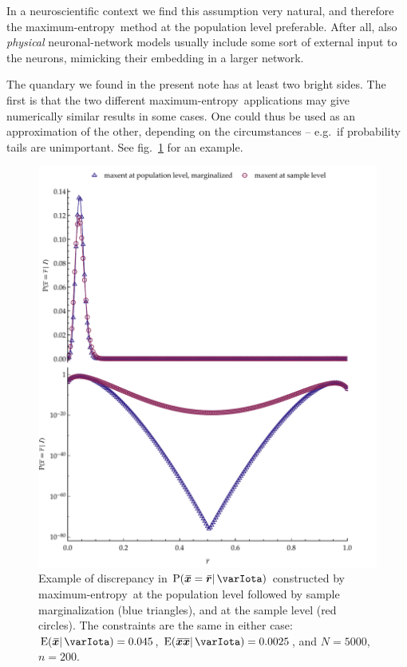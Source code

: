 \documentclass{article}
\theoremstyle{remark}
\theoremstyle{innote}
\renewcommand*{\|}{\mathpunct{|}}%
\newcommand*{\p}{\mathrm{P}}%
\newcommand*{\fig}{fig.}%
\newcommand*{\eg}{{e.g.}}
\newcommand*{\E}{\mathrm{E}}
\DeclarePairedDelimiter\expp{(}{)}
\newcommand*{\expe}{\E\expp}%
\theoremstyle{simple}
\newcommand*{\widebar}[1]{{\mkern1.5mu\skew{2}\overline{\mkern-1.5mu#1\mkern-1.5mu}\mkern 1.5mu}}
\newcommand*{\sav}{\widebar} %
\newcommand*{\yxx}{x}%
\newcommand*{\yx}{\bm{\yxx}}%
\newcommand*{\yxs}{\sav{\yx}}%
\newcommand*{\yxxs}{\sav{\yx\yx}}%
\newcommand*{\yr}{\bm{r}}%
\newcommand*{\yrs}{\sav{\yr}}%
\newcommand*{\yH}{\varIota}
\newcommand*{\me}{maximum-entropy}
\begin{document}
In a neuroscientific context we find this assumption very natural, and
therefore the \me\ method at the population level preferable. After all,
also \emph{physical} neuronal-network models usually include some sort of
external input to the neurons, mimicking their embedding in a larger
network.

\iffalse
The quandary we found in the present note has at least two bright sides.
The first is that the two different \me\ applications may give numerically
similar results in some cases. One could thus be used as an approximation
of the other, depending on the circumstances -- \eg\ if probability tails
are unimportant. See \fig~\ref{fig:diff_maxent_pop_sample_realdata} for an
example.
\begin{figure}[!t]
\centering
\includegraphics[width=0.95\columnwidth]{different_maxent_pop_sample_200_realdata_both.pdf}
% 
\caption{Example of discrepancy in $\p(\yxs = \yrs \| \yH)$ constructed by
  \me\ at the population level followed by sample marginalization (blue
  triangles), and at the sample level (red circles). The constraints are
  the same in either case: $\expe{\yxs \|\yH}=0.045$,
  $\expe{\yxxs \|\yH}=0.0025$, and $N=5000$, $n=200$.}
\label{fig:diff_maxent_pop_sample_realdata}
\end{figure}%
\end{document}
